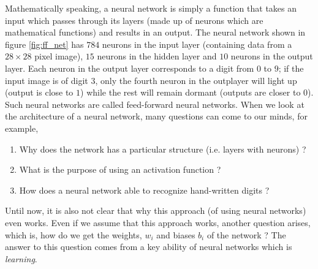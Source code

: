 Mathematically speaking, a neural network is simply a function that takes an input which passes through
its layers (made up of neurons which are mathematical functions) and results in an output. The neural 
network shown in figure \ref{fig:ff_net} has $784$ neurons in the input layer (containing data from a $28 \times 28$ pixel image), $15$
neurons in the hidden layer and $10$ neurons in the output layer. Each neuron in the output layer corresponds to a digit from $0$ to $9$; if
the input image is of digit $3$, only the fourth neuron in the outplayer will light up (output is close to $1$) while the rest will remain dormant (outputs are closer to $0$).
Such neural networks are called feed-forward neural networks. When we look at the architecture of a neural network, many questions can 
come to our minds, for example, 
\begin{enumerate}
    \item Why does the network has a particular structure (i.e. layers with neurons) ?
    \item What is the purpose of using an activation function ?
    \item How does a neural network able to recognize hand-written digits ?
\end{enumerate} 
Until now, it is also not clear that why this approach (of using neural networks) even works. Even if we assume that this approach works, another question arises,
which is, how do we get the weights, $w_i$ and biases $b_i$ of the network ? The answer to this question
comes from a key ability of neural networks which is \emph{learning}.
